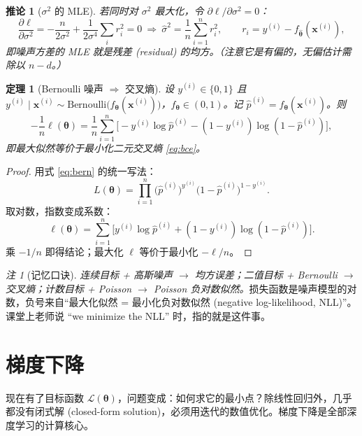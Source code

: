 \documentclass[UTF8,a4paper,11pt]{ctexart}
\theoremstyle{definition}
\theoremstyle{plain}
\newtheorem{theorem}[definition]{定理}
\newtheorem{corollary}[definition]{推论}
\theoremstyle{remark}
\newtheorem{remark}[definition]{注}
\newcommand{\Loss}{\mathcal{L}}
\newcommand{\eng}[1]{\textup{(#1)}}
\begin{document}
\begin{corollary}[$\sigma^2$ 的 MLE]
若同时对 $\sigma^2$ 最大化，令 $\partial\ell/\partial\sigma^2=0$：
\[
  \frac{\partial\ell}{\partial\sigma^2}=-\frac{n}{2\sigma^2}+\frac{1}{2\sigma^4}\sum_i r_i^2=0
  \ \Longrightarrow\ \hat\sigma^2=\frac1n\sum_{i=1}^n r_i^2,\qquad r_i=y^{(i)}-f_{\hat{\bm{\theta}}}(\bm{x}^{(i)}),
\]
即噪声方差的 MLE 就是残差 \eng{residual} 的均方。（注意它是有偏的，无偏估计需除以 $n-d$。）
\end{corollary}

\begin{theorem}[Bernoulli 噪声 $\Longrightarrow$ 交叉熵]\label{thm:bern-ce}
设 $y^{(i)}\in\{0,1\}$ 且 $y^{(i)}\mid\bm{x}^{(i)}\sim\mathrm{Bernoulli}\big(f_{\bm{\theta}}(\bm{x}^{(i)})\big)$，$f_{\bm{\theta}}\in(0,1)$。记 $\hat p^{(i)}=f_{\bm{\theta}}(\bm{x}^{(i)})$。则
\[
  -\frac1n\ell(\bm{\theta})=\frac1n\sum_{i=1}^{n}
  \Big[-y^{(i)}\log\hat p^{(i)}-(1-y^{(i)})\log(1-\hat p^{(i)})\Big],
\]
即最大似然等价于最小化二元交叉熵 \eqref{eq:bce}。
\end{theorem}

\begin{proof}
用式 \eqref{eq:bern} 的统一写法：
\[
  L(\bm{\theta})=\prod_{i=1}^{n}\big(\hat p^{(i)}\big)^{y^{(i)}}\big(1-\hat p^{(i)}\big)^{1-y^{(i)}} .
\]
取对数，指数变成系数：
\[
  \ell(\bm{\theta})=\sum_{i=1}^{n}\Big[y^{(i)}\log\hat p^{(i)}+(1-y^{(i)})\log(1-\hat p^{(i)})\Big].
\]
乘 $-1/n$ 即得结论；最大化 $\ell$ 等价于最小化 $-\ell/n$。
\end{proof}

\begin{remark}[记忆口诀]
\emph{连续目标 + 高斯噪声 $\to$ 均方误差；二值目标 + Bernoulli $\to$ 交叉熵；计数目标 + Poisson $\to$ Poisson 负对数似然。}损失函数是噪声模型的对数，负号来自“最大化似然 = 最小化负对数似然 \eng{negative log-likelihood, NLL}”。课堂上老师说 “we minimize the NLL” 时，指的就是这件事。
\end{remark}

\section{梯度下降}\label{sec:gd}

现在有了目标函数 $\Loss(\bm{\theta})$，问题变成：如何求它的最小点？除线性回归外，几乎都没有闭式解 \eng{closed-form solution}，必须用迭代的数值优化。梯度下降是全部深度学习的计算核心。
\end{document}
